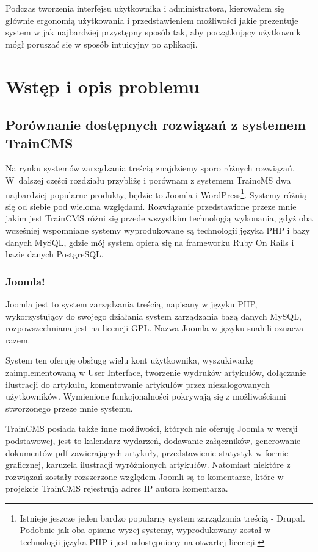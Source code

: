 \documentclass[openright]{xmgr}
\begin{document}
Podczas tworzenia interfejsu użytkownika i administratora, kierowałem się głównie ergonomią użytkowania i przedstawieniem możliwości jakie prezentuje system w jak najbardziej przystępny sposób tak, aby początkujący użytkownik mógł poruszać się w sposób intuicyjny po aplikacji.

\chapter{Wstęp i opis problemu}

\section{Porównanie dostępnych rozwiązań z systemem TrainCMS}

Na rynku systemów zarządzania treścią znajdziemy sporo różnych rozwiązań. W~dalszej części rozdziału przybliżę i porównam z systemem TraincMS dwa najbardziej popularne produkty, będzie to Joomla i WordPress\footnote{Istnieje jeszcze jeden bardzo popularny system zarządzania treścią - Drupal. Podobnie jak oba opisane wyżej systemy, wyprodukowany został w technologii języka PHP i jest udostępniony na otwartej licencji.}. Systemy różnią się od siebie pod wieloma względami. Rozwiązanie przedstawione przeze mnie jakim jest TrainCMS różni się  przede wszystkim technologią wykonania, gdyż oba wcześniej wspomniane systemy wyprodukowane są technologii języka PHP i bazy danych MySQL, gdzie mój system opiera się na frameworku Ruby On Rails i bazie danych PostgreSQL.

\subsection{Joomla!}

Joomla jest to system zarządzania treścią, napisany w języku PHP, wykorzystujący do swojego działania system zarządzania bazą danych MySQL, rozpowszechniana jest na licencji GPL. Nazwa Joomla w języku suahili oznacza razem.

System ten oferuję obsługę wielu kont użytkownika, wyszukiwarkę zaimplementowaną w User Interface, tworzenie wydruków artykułów, dołączanie ilustracji do artykułu, komentowanie artykułów przez niezalogowanych użytkowników. Wymienione funkcjonalności pokrywają się z możliwościami stworzonego przeze mnie systemu. 

\newpage

TrainCMS posiada także inne możliwości, których nie oferuję Joomla w wersji podstawowej, jest to kalendarz wydarzeń, dodawanie załączników, generowanie dokumentów pdf zawierających artykuły, przedstawienie statystyk w formie graficznej, karuzela ilustracji wyróżnionych artykułów. Natomiast niektóre z rozwiązań zostały rozszerzone względem Joomli są to komentarze, które w projekcie TrainCMS rejestrują adres IP autora komentarza. 
\end{document}
